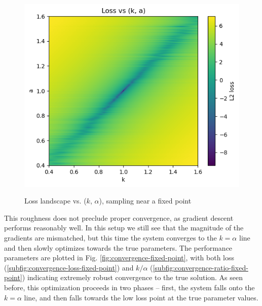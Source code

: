 \documentclass[]{article}
\begin{document}
\begin{figure}[H]
	\caption{Loss landscape vs. ($k$, $\alpha$), sampling near a fixed point}
	\centering
	\includegraphics[scale=0.70]{loss-landscape-fixed-point.png}
	\label{fig:loss-landscape-fixed-point}
\end{figure}

This roughness does not preclude proper convergence, as gradient descent performs reasonably well. In this setup we still see that the magnitude of the gradients are mismatched, but this time the system converges to the $k=\alpha$ line and then slowly optimizes towards the true parameters. The performance parameters are plotted in Fig. \ref{fig:convergence-fixed-point}, with both loss (\ref{subfig:convergence-loss-fixed-point}) and $k/\alpha$ (\ref{subfig:convergence-ratio-fixed-point}) indicating extremely robust convergence to the true solution. As seen before, this optimization proceeds in two phases -- first, the system falls onto the $k=\alpha$ line, and then falls towards the low loss point at the true parameter values.
\end{document}
